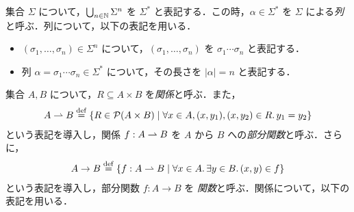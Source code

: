 集合 $\Sigma$ について，$\bigcup_{n \in \mathbb{N}} \Sigma^n$ を $\Sigma^*$ と表記する．この時，$\alpha \in \Sigma^*$ を $\Sigma$ による\emph{列}と呼ぶ．列について，以下の表記を用いる．
\begin{itemize}
  \item $(\sigma_1, \ldots, \sigma_n) \in \Sigma^n$ について，$(\sigma_1, \ldots, \sigma_n)$ を $\sigma_1 \cdots \sigma_n$ と表記する．
  \item 列 $\alpha = \sigma_1 \cdots \sigma_n \in \Sigma^*$ について，その長さを $|\alpha| = n$ と表記する．
\end{itemize}

集合 $A, B$ について，$R \subseteq A \times B$ を\emph{関係}と呼ぶ．また，
\begin{align*}
  A \rightharpoonup B \mathrel{\overset{\mathrm{def}}{=}} \{R \in \mathcal{P}(A \times B) \mid \forall x \in A, (x, y_1), (x, y_2) \in R\ldotp y_1 = y_2\}
\end{align*}
という表記を導入し，関係 $f: A \rightharpoonup B$ を $A$ から $B$ への\emph{部分関数}と呼ぶ．さらに，
\begin{align*}
  A \to B \mathrel{\overset{\mathrm{def}}{=}} \{f: A \rightharpoonup B \mid \forall x \in A\ldotp\exists y \in B\ldotp (x, y) \in f\}
\end{align*}
という表記を導入し，部分関数 $f: A \to B$ を \emph{関数}と呼ぶ．関係について，以下の表記を用いる．
